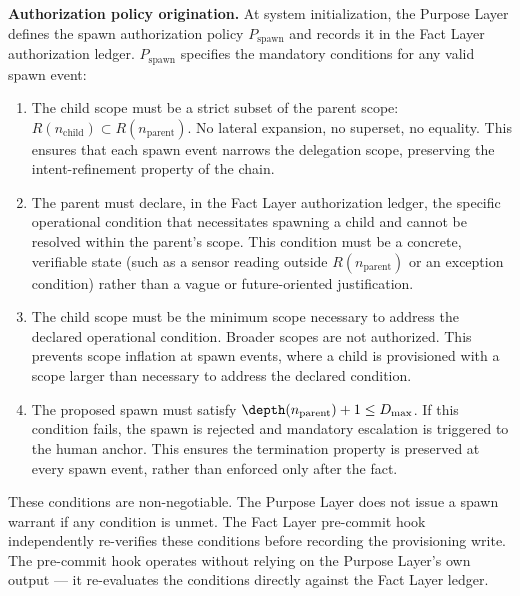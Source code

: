 \bigskip
\noindent\textbf{Authorization policy origination.} At system initialization, the Purpose Layer defines the spawn authorization policy $P_{\text{spawn}}$ and records it in the Fact Layer authorization ledger. $P_{\text{spawn}}$ specifies the mandatory conditions for any valid spawn event:

\begin{enumerate}
    \item[(S1) \textbf{Scope refinement}] The child scope must be a strict subset of the parent scope: $R(n_{\text{child}}) \subset R(n_{\text{parent}})$. No lateral expansion, no superset, no equality. This ensures that each spawn event narrows the delegation scope, preserving the intent-refinement property of the chain.

    \item[(S2) \textbf{Operational necessity}] The parent must declare, in the Fact Layer authorization ledger, the specific operational condition that necessitates spawning a child and cannot be resolved within the parent's scope. This condition must be a concrete, verifiable state (such as a sensor reading outside $R(n_{\text{parent}})$ or an exception condition) rather than a vague or future-oriented justification.

    \item[(S3) \textbf{Minimum scope proportionality}] The child scope must be the minimum scope necessary to address the declared operational condition. Broader scopes are not authorized. This prevents scope inflation at spawn events, where a child is provisioned with a scope larger than necessary to address the declared condition.

    \item[(S4) \textbf{Depth bound compliance}] The proposed spawn must satisfy $\depth(n_{\text{parent}}) + 1 \leq D_{\max}$. If this condition fails, the spawn is rejected and mandatory escalation is triggered to the human anchor. This ensures the termination property is preserved at every spawn event, rather than enforced only after the fact.
\end{enumerate}

These conditions are non-negotiable. The Purpose Layer does not issue a spawn warrant if any condition is unmet. The Fact Layer pre-commit hook independently re-verifies these conditions before recording the provisioning write. The pre-commit hook operates without relying on the Purpose Layer's own output --- it re-evaluates the conditions directly against the Fact Layer ledger.

